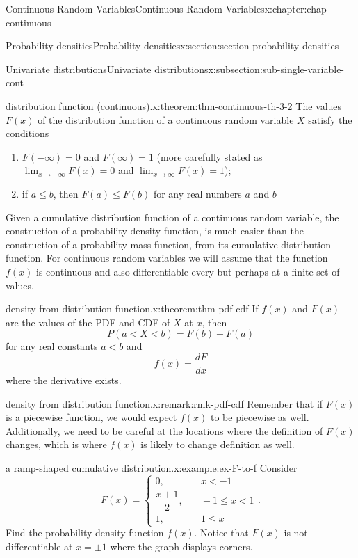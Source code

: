 \documentclass[oneside,10pt,]{book}
\numberwithin{equation}{section}
\newcommand{\lt}{<}
\newcommand{\amp}{&}
\begin{document}
\begin{chapterptx}{Continuous Random Variables}{}{Continuous Random Variables}{}{}{x:chapter:chap-continuous}
\begin{sectionptx}{Probability densities}{}{Probability densities}{}{}{x:section:section-probability-densities}
\begin{subsectionptx}{Univariate distributions}{}{Univariate distributions}{}{}{x:subsection:sub-single-variable-cont}
\begin{theorem}{distribution function (continuous).}{}{x:theorem:thm-continuous-th-3-2}
The values \(F(x)\) of the distribution function of a continuous random variable \(X\) satisfy the conditions%
\begin{enumerate}
\item{}\(F(-\infty) = 0\) and \(F(\infty) = 1\) (more carefully stated as \(\displaystyle\lim_{x\to-\infty}F(x) = 0\) and \(\displaystyle\lim_{x\to\infty}
F(x) = 1\));%
\item{}if \(a \le b\), then \(F(a) \le F(b)\) for any real numbers \(a\) and \(b\)%
\end{enumerate}
%
\end{theorem}
Given a cumulative distribution function of a continuous random variable, the construction of a probability density function, is much easier than the construction of a probability mass function, from its cumulative distribution function. For continuous random variables we will assume that the function \(f(x)\) is continuous and also differentiable every but perhaps at a finite set of values.%
\begin{theorem}{density from distribution function.}{}{x:theorem:thm-pdf-cdf}%
If \(f(x)\) and \(F(x)\) are the values of the PDF and CDF of \(X\) at \(x\), then%
\begin{equation*}
P(a \lt X \lt b) = F(b) - F(a)
\end{equation*}
for any real constants \(a \lt
b\) and%
\begin{equation*}
f(x) = \dfrac{dF}{dx}
\end{equation*}
where the derivative exists.%
\end{theorem}
\begin{remark}{density from distribution function.}{x:remark:rmk-pdf-cdf}%
Remember that if \(F(x)\) is a piecewise function, we would expect \(f(x)\) to be piecewise as well.  Additionally, we need to be careful at the locations where the definition of \(F(x)\) changes, which is where \(f(x)\) is likely to change definition as well.%
\end{remark}
\begin{example}{a ramp-shaped cumulative distribution.}{x:example:ex-F-to-f}%
Consider%
\begin{equation*}
F(x) = \begin{cases}0, \amp \quad x \lt -1\\\dfrac{x+1}{2},
\amp \quad -1 \le x \lt 1\\ 1, \amp \quad 1 \le x\end{cases}\text{.}
\end{equation*}
Find the probability density function \(f(x)\). Notice that \(F(x)\) is not differentiable at \(x = \pm 1\) where the graph displays corners.%

\end{example}
\end{subsectionptx}
\end{sectionptx}
\end{chapterptx}
\end{document}
